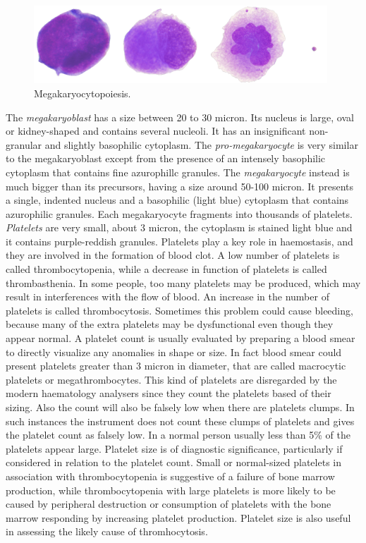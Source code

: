 \documentclass[final,a4paper,12pt,english]{UnicaPhdThesis3}
\begin{document}
\begin{figure}[!htbp]
\centering
\includegraphics[width=0.98\textwidth]{images/megakaryopoiesis}
\caption{\label{fig:Megakaryocytopoiesis} Megakaryocytopoiesis.}
\end{figure}

The \textit{megakaryoblast} has a size between 20 to 30 micron. Its nucleus is large, oval or kidney-shaped and contains several nucleoli. It has an insignificant non-granular and slightly basophilic cytoplasm. The \textit{pro-megakaryocyte} is very similar to the megakaryoblast except from the presence of an intensely basophilic cytoplasm that contains fine azurophillc granules. The \textit{megakaryocyte} instead is much bigger than its precursors, having a size around 50-100 micron. It presents a single, indented nucleus and a basophilic (light blue) cytoplasm that contains azurophilic granules. Each megakaryocyte fragments into thousands of platelets. \textit{Platelets} are very small, about 3 micron, the cytoplasm is stained light blue and it contains purple-reddish granules. Platelets play a key role in haemostasis, and they are involved in the formation of blood clot. A low number of platelets is called thrombocytopenia, while a decrease in function of platelets is called thrombasthenia. In some people, too many platelets may be produced, which may result in interferences with the flow of blood. An increase in the number of platelets is called thrombocytosis. Sometimes this problem could cause bleeding, because many of the extra platelets may be dysfunctional even though they appear normal. A platelet count is usually evaluated by preparing a blood smear to directly visualize any anomalies in shape or size. In fact blood smear could present platelets greater than 3 micron in diameter, that are called macrocytic platelets or megathrombocytes. This kind of platelets are disregarded by the modern haematology analysers since they count the platelets based of their sizing. Also the count will also be falsely low when there are platelets clumps. In such instances the instrument does not count these clumps of platelets and gives the platelet count as falsely low. In a normal person usually less than 5\% of the platelets appear large. Platelet size is of diagnostic significance, particularly if considered in relation to the platelet count. Small or normal-sized platelets in association with thrombocytopenia is suggestive of a failure of bone marrow production, while thrombocytopenia with large platelets is more likely to be caused by peripheral destruction or consumption of platelets with the bone marrow responding by increasing platelet production. Platelet size is also useful in assessing the likely cause of thromhocytosis. 
\end{document}
